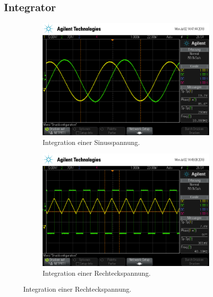 \subsection{Integrator}
\begin{figure}[ht]
  \centering
  
  \caption{}
  \label{fig:int}
\end{figure}
\begin{figure}[ht]
  \centering
  \begin{subfigure}[]{\textwidth}
    \centering
    \includegraphics[height=0.3\textheight]{data/scope_262.png}
    \caption{Integration einer Sinusspannung.}
    \label{subfig:int_sinus}
  \end{subfigure}
  \begin{subfigure}[]{\textwidth}
    \centering
    \includegraphics[height=0.3\textheight]{data/scope_263.png}
    \caption{Integration einer Rechteckspannung.}

\end{subfigure}
\end{figure}
